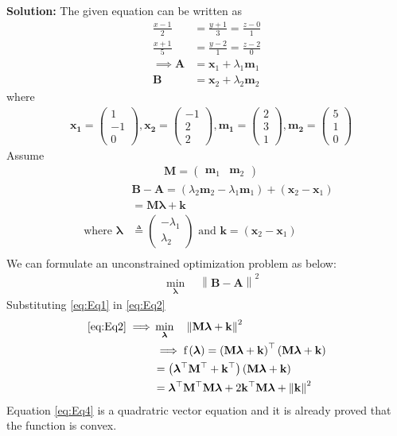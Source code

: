 \documentclass[12pt]{article}
\providecommand{\brak}[1]{\ensuremath{\left(#1\right)}}
\providecommand{\norm}[1]{\left\lVert#1\right\rVert}
\newcommand{\solution}{\noindent \textbf{Solution: }}
\newcommand{\myvec}[1]{\ensuremath{\begin{pmatrix}#1\end{pmatrix}}}
\let\vec\mathbf
\begin{document}
\begin{enumerate}
\solution 
The given equation can be written as
\begin{align}
	\frac{x-1}{2} &= \frac{y+1}{3}=\frac{z-0}{1}\\ 
	\frac{x+1}{5} &= \frac{y-2}{1}= \frac{z-2}{0} \\ 
	\implies 
	\vec{A} &= \vec{x}_1 + \lambda_1\vec{m}_1\\
	\vec{B} &= \vec{x}_2 + \lambda_2\vec{m}_2
\end{align}	
where
\begin{align}
	&\vec{x_1} = \myvec{1\\-1\\0},  
	\vec{x_2} = \myvec{-1\\2\\2},  
	\vec{m_1} = \myvec{2\\3\\1},
	\vec{m_2} = \myvec{5\\1\\0}  
\end{align}	
Assume
\begin{align}
	&\vec{M} = \myvec{\vec{m}_1 & \vec{m}_2} 
\end{align}
\begin{align}
	&\vec{B}-\vec{A} = \brak{\lambda_2\vec{m}_2 - \lambda_1\vec{m}_1} + \brak{\vec{x}_2- \vec{x}_1} \\ 
	\label{eq:Eq1}
	&= \vec{M}\bm{\lambda}+ \vec{k} \\
	\text{ where } \bm{\lambda} &\triangleq \myvec{-\lambda_1\\ \lambda_2}\text{ and }\vec{k} =\brak{\vec{x}_2- \vec{x}_1}  \\
\end{align}
We can formulate an unconstrained optimization problem as below:
\begin{align}
	\label{eq:Eq2}
	&  \min_{\bm{\lambda}} \quad \norm{\vec{B}-\vec{A}}^2 
\end{align}
Substituting \eqref{eq:Eq1} in \eqref{eq:Eq2}
\begin{align}
	\eqref{eq:Eq2} \implies 
	&  \min_{\bm{\lambda}} \quad \norm{\vec{M}\bm{\lambda}+\vec{k}}^2 \\ 
	&\implies \text{f}\brak{\bm{\lambda}} = \brak{\vec{M}\bm{\lambda}+\vec{k}}^\top\brak{\vec{M}\bm{\lambda}+\vec{k}} \\
	&= \brak{\bm{\lambda}^\top\vec{M}^\top+\vec{k}^\top}\brak{\vec{M}\bm{\lambda}+\vec{k}} \\
	\label{eq:Eq4} 
	&= \bm{\lambda}^\top\vec{M}^\top\vec{M}\bm{\lambda}+2\vec{k}^\top\vec{M}\bm{\lambda}+ \norm{\vec{k}}^2 
\end{align}
Equation \eqref{eq:Eq4} is a quadratric vector equation and it is already proved that the function is convex. 


\end{enumerate}
\end{document}
